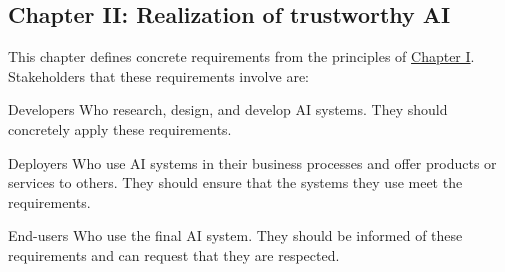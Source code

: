 \subsection{Chapter II: Realization of trustworthy AI} \label{sec:hleg_ch2}

This chapter defines concrete requirements from the principles of \hyperref[sec:hleg_ch1]{Chapter I}. Stakeholders that these requirements involve are:
\begin{descriptionlist}
    \item[Developers] 
        Who research, design, and develop AI systems. They should concretely apply these requirements.

    \item[Deployers] 
        Who use AI systems in their business processes and offer products or services to others. They should ensure that the systems they use meet the requirements.

    \item[End-users] 
        Who use the final AI system. They should be informed of these requirements and can request that they are respected.
\end{descriptionlist}

